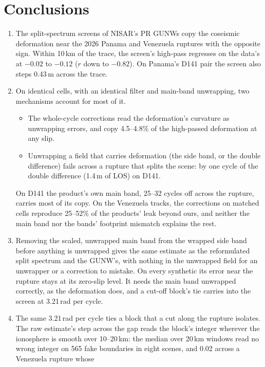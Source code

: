 \section{Conclusions}
\label{sec:conclusions}
\begin{enumerate}
  \item The split-spectrum screens of NISAR's PR GUNWs copy the coseismic deformation near the 2026 Panama and
        Venezuela ruptures with the opposite sign. Within 10\,km of the trace, the screen's high-pass regresses on
        the data's at $-0.02$ to $-0.12$ ($r$ down to $-0.82$). On Panama's D141 pair the screen also steps 0.43\,m
        across the trace.
  \item On identical cells, with an identical filter and main-band unwrapping, two mechanisms account for most of it.
        \begin{itemize}
          \item The whole-cycle corrections read the deformation's curvature as unwrapping errors, and copy
                4.5--4.8\% of the high-passed deformation at any slip.
          \item Unwrapping a field that carries deformation (the side band, or the double difference) fails across a
                rupture that splits the scene: by one cycle of the double difference (1.4\,m of LOS) on D141.
        \end{itemize}
        On D141 the product's own main band, 25--32 cycles off across the rupture, carries most of its copy. On the
        Venezuela tracks, the corrections on matched cells reproduce 25--52\% of the products' leak beyond ours, and
        neither the main band nor the bands' footprint mismatch explains the rest.
  \item Removing the scaled, unwrapped main band from the wrapped side band before anything is unwrapped gives the
        same estimate as the reformulated split spectrum and the GUNW's, with nothing in the unwrapped field for an
        unwrapper or a correction to mistake. On every synthetic its error near the rupture stays at its zero-slip
        level. It needs the main band unwrapped correctly, as the deformation does, and a cut-off block's tie carries
        into the screen at 3.21\,rad per cycle.
  \item The same 3.21\,rad per cycle ties a block that a cut along the rupture isolates. The raw estimate's step across
        the gap reads the block's integer wherever the ionosphere is smooth over 10--20\,km: the median over 20\,km
        windows read no wrong integer on 565 fake boundaries in eight scenes, and 0.02 across a Venezuela rupture whose

\end{enumerate}
